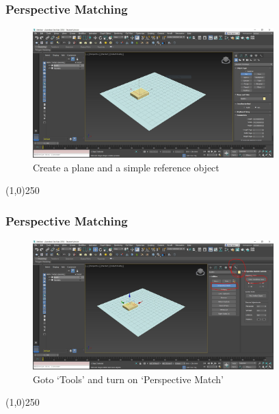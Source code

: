 \begin{frame}
	\frametitle{Perspective Matching}
	\begin{figure}
		\centering
		\includegraphics[height=5cm]{./img/PerspectiveMatching/1.jpg}
		\caption[Create a plane and a simple reference object]{Create a plane and a simple reference object}
		\label{fig:PerspectiveMatch1}
	\end{figure}
\end{frame}
\begin{center}\line(1,0){250}\end{center}


\begin{frame}
	\frametitle{Perspective Matching}
	\begin{figure}
		\centering
		\includegraphics[height=5cm]{./img/PerspectiveMatching/2.jpg}
		\caption[Goto `Tools' and turn on `Perspective Match']{Goto `Tools' and turn on `Perspective Match'}
		\label{fig:PerspectiveMatch2}
	\end{figure}
\end{frame}
\begin{center}\line(1,0){250}\end{center}



